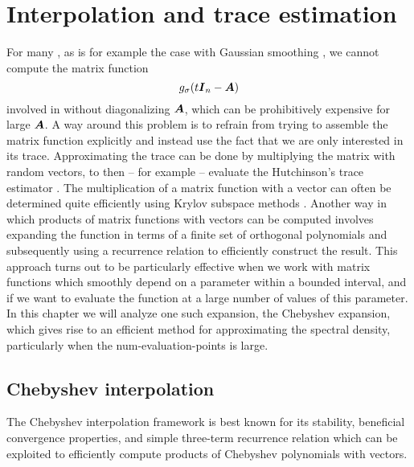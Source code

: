 \chapter{Interpolation and trace estimation}
\label{chp:2-chebyshev}

For many , as is for example the case with Gaussian smoothing
, we cannot compute the matrix function
\begin{equation}
    g_{\sigma}(t\boldsymbol{I}_n - \boldsymbol{A})
    \label{equ:2-chebyshev-matrix-function}
\end{equation}
involved in  without
diagonalizing $\boldsymbol{A}$, which can be prohibitively expensive for large
$\boldsymbol{A}$. A way around this problem is to refrain from trying to assemble the
matrix function explicitly and instead use the fact that we are only interested
in its trace. Approximating the trace can be done by multiplying the matrix
with random vectors, to then -- for example -- evaluate the Hutchinson's trace estimator \cite{hutchinson1990trace}.
The multiplication of a matrix function with a vector can
often be determined quite efficiently using Krylov subspace methods
\cite[chapter~13.2]{higham2008functions}. Another way in which products of matrix
functions with vectors can be computed involves
expanding the function in terms of a finite set of orthogonal polynomials
and subsequently using a recurrence relation to efficiently construct the result.
This approach turns out to be particularly effective when we work with matrix
functions which smoothly depend on a parameter within a bounded interval, and if we
want to evaluate the function at a large number of values of this parameter.
In this chapter we will analyze one such expansion, the Chebyshev expansion,
which gives rise to an efficient method for approximating the spectral density,
particularly when the \gls{num-evaluation-points} is large.


\section{Chebyshev interpolation}
\label{sec:2-chebyshev-interpolation}

The Chebyshev interpolation framework is best known for its stability, beneficial
convergence properties, and simple three-term recurrence relation
 which can
be exploited to efficiently compute products of Chebyshev polynomials with
vectors.\\

